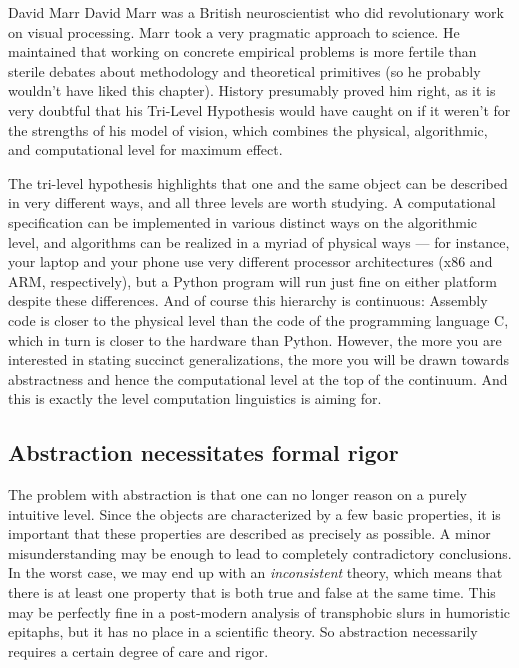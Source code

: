 \begin{person}[1945-1980]{David Marr}
    David Marr was a British neuroscientist who did revolutionary work on visual processing.
    Marr took a very pragmatic approach to science.
    He maintained that working on concrete empirical problems is more fertile than sterile debates about methodology and theoretical primitives (so he probably wouldn't have liked this chapter).
    History presumably proved him right, as it is very doubtful that his Tri-Level Hypothesis would have caught on if it weren't for the strengths of his model of vision, which combines the physical, algorithmic, and computational level for maximum effect.
\end{person}

The tri-level hypothesis highlights that one and the same object can be described in very different ways, and all three levels are worth studying.
A computational specification can be implemented in various distinct ways on the algorithmic level, and algorithms can be realized in a myriad of physical ways --- for instance, your laptop and your phone use very different processor architectures (x86 and ARM, respectively), but a Python program will run just fine on either platform despite these differences.
And of course this hierarchy is continuous: Assembly code is closer to the physical level than the code of the programming language C, which in turn is closer to the hardware than Python.
However, the more you are interested in stating succinct generalizations, the more you will be drawn towards abstractness and hence the computational level at the top of the continuum.
And this is exactly the level computation linguistics is aiming for.

\subsection{Abstraction necessitates formal rigor}
\label{ssec:formal_abstracness_rigor}

The problem with abstraction is that one can no longer reason on a purely intuitive level.
Since the objects are characterized by a few basic properties, it is important that these properties are described as precisely as possible.
A minor misunderstanding may be enough to lead to completely contradictory conclusions.
In the worst case, we may end up with an \emph{inconsistent} theory, which means that there is at least one property that is both true and false at the same time.
This may be perfectly fine in a post-modern analysis of transphobic slurs in humoristic epitaphs, but it has no place in a scientific theory.
So abstraction necessarily requires a certain degree of care and rigor.

